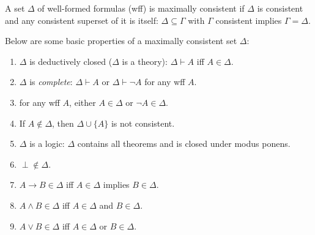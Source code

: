 \documentclass[12pt]{article}
\begin{document}
A set $\Delta$ of well-formed formulas (wff) is maximally consistent if $\Delta$ is consistent and any consistent superset of it is itself: $\Delta \subseteq \Gamma$ with $\Gamma$ consistent implies $\Gamma=\Delta$.

Below are some basic properties of a maximally consistent set $\Delta$:
\begin{enumerate}
\item $\Delta$ is deductively closed ($\Delta$ is a theory): $\Delta\vdash A$ iff $A\in \Delta$.
\item $\Delta$ is \emph{complete}: $\Delta \vdash A$ or $\Delta\vdash \neg A$ for any wff $A$.
\item for any wff $A$, either $A\in \Delta$ or $\neg A\in \Delta$.
\item If $A\notin \Delta$, then $\Delta\cup\lbrace A\rbrace$ is not consistent.
\item $\Delta$ is a logic: $\Delta$ contains all theorems and is closed under modus ponens.
\item $\perp \notin \Delta$.
\item $A\to B \in \Delta$ iff $A\in \Delta$ implies $B\in \Delta$.
\item $A\land B \in \Delta$ iff $A\in \Delta$ and $B\in \Delta$.
\item $A\lor B \in \Delta$ iff $A \in \Delta$ or $B\in \Delta$.
\end{enumerate}
\end{document}
